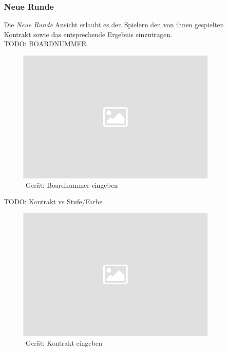 \subsubsection{Neue Runde}\label{cli/newround}

\noindent
Die \textit{Neue Runde} Ansicht erlaubt es den Spielern den von ihnen
gespielten Kontrakt sowie das entsprechende Ergebnis einzutragen.\\[.1cm]

\noindent
TODO: BOARDNUMMER\\[.1cm]

\noindent
\begin{figure}[ht]
	\centering
  \includegraphics[width=10cm]{pictures/placeholder.png}
	\caption{\cli-Gerät: Boardnummer eingeben}
	\label{pic/cli_2_boardnummer}
\end{figure}

\noindent
TODO: Kontrakt vs Stufe/Farbe\\[.1cm]

\noindent
\begin{figure}[ht]
	\centering
  \includegraphics[width=10cm]{pictures/placeholder.png}
	\caption{\cli-Gerät: Kontrakt eingeben}
	\label{pic/cli_2_contract}
\end{figure}

